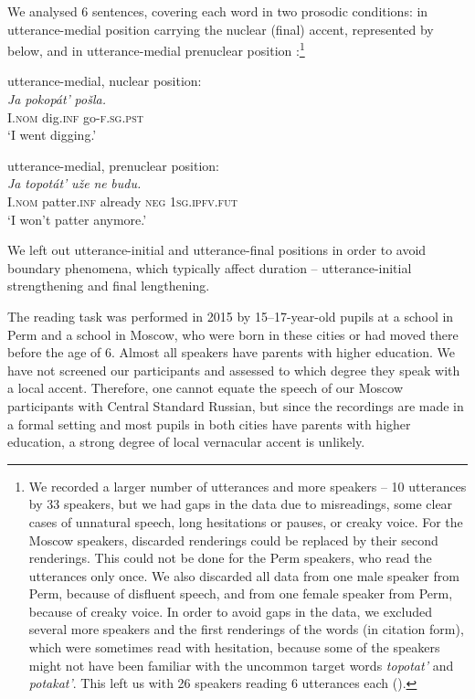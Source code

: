 \documentclass[output=paper]{langscibook}
\begin{document}
We analysed 6 sentences, covering each word in two prosodic conditions: in utterance-medial position carrying the nuclear (final) accent, represented by  below, and in utterance-medial prenuclear position :\footnote{We recorded a larger number of utterances and more speakers – 10 utterances by 33 speakers, but we had gaps in the data due to misreadings, some clear cases of unnatural speech, long hesitations or pauses, or creaky voice. For the Moscow speakers, discarded renderings could be replaced by their second renderings. This could not be done for the Perm speakers, who read the utterances only once. We also discarded all data from one male speaker from Perm, because of disfluent speech, and from one female speaker from Perm, because of creaky voice. In order to avoid gaps in the data, we excluded several more speakers and the first renderings of the words (in citation form), which were sometimes read with hesitation, because some of the speakers might not have been familiar with the uncommon target words \textit{topotat'} and \textit{potakat'}. This left us with 26 speakers reading 6 utterances each ().}

\ea \label{ex:post:1}
utterance-medial, nuclear position:\\
\gll \textit{Ja}        \textit{pokopát'}  \textit{pošla.}\\
     \textsc{I}.\textsc{nom} dig.\textsc{inf}       go-\textsc{f.sg.pst}\\
\glt `I went digging.'
\z 

\ea \label{ex:post:2}
utterance-medial, prenuclear position: \\
\gll \textit{Ja}       \textit{topotát’}   \textit{uže}        \textit{ne}   \textit{budu.}\\
     \textsc{I}.\textsc{nom} patter.\textsc{inf} already \textsc{neg} \textsc{1sg.ipfv.fut}\\
\glt `I won’t patter anymore.'\\
\z

\begin{sloppypar}
We left out utterance-initial and utterance-final positions in order to avoid boundary phenomena, which typically affect duration -- utterance-initial strengthening and final lengthening.
\end{sloppypar}



The reading task was performed in 2015 by 15--17-year-old pupils at a school in Perm and a school in Moscow, who were born in these cities or had moved there before the age of 6. Almost all speakers have parents with higher education. We have not screened our participants and assessed to which degree they speak with a local accent. Therefore, one cannot equate the speech of our Moscow participants with Central Standard Russian, but since the recordings are made in a formal setting and most pupils in both cities have parents with higher education, a strong degree of local vernacular accent is unlikely.
\end{document}
